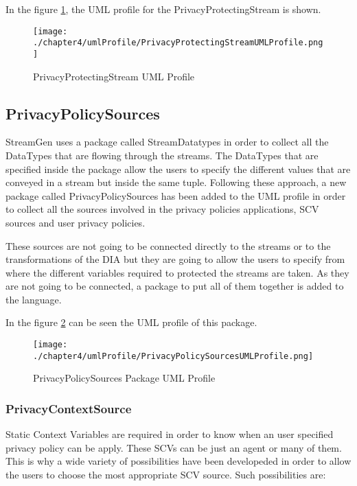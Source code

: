 In the figure \ref{fig:PrivacyProtectingStream UML Profile}, the UML profile for the PrivacyProtectingStream is shown.

\begin{figure}
\centering
{\texttt{[image: ./chapter4/umlProfile/PrivacyProtectingStreamUMLProfile.png]}}
\caption{PrivacyProtectingStream UML Profile}
\label{fig:PrivacyProtectingStream UML Profile}
\end{figure}

\subsection{PrivacyPolicySources} %

StreamGen uses a package called StreamDatatypes in order to collect all the DataTypes that are flowing through the streams. The DataTypes that are specified inside the package allow the users to specify the different values that are conveyed in a stream but inside the same tuple. Following these approach, a new package called PrivacyPolicySources has been added to the UML profile in order to collect all the sources involved in the privacy policies applications, SCV sources and user privacy policies.

These sources are not going to be connected directly to the streams or to the transformations of the DIA but they are going to allow the users to specify from where the different variables required to protected the streams are taken. As they are not going to be connected, a package to put all of them together is added to the language.

In the figure \ref{fig:PrivacyPolicySources Package UML Profile} can be seen the UML profile of this package.

\begin{figure}
\centering
{\texttt{[image: ./chapter4/umlProfile/PrivacyPolicySourcesUMLProfile.png]}}
\caption{PrivacyPolicySources Package UML Profile}
\label{fig:PrivacyPolicySources Package UML Profile}
\end{figure}


\subsubsection{PrivacyContextSource}

Static Context Variables are required in order to know when an user specified privacy policy can be apply. These SCVs can be just an agent or many of them. This is why a wide variety of possibilities have been developeded in order to allow the users to choose the most appropriate SCV source. Such possibilities are:

